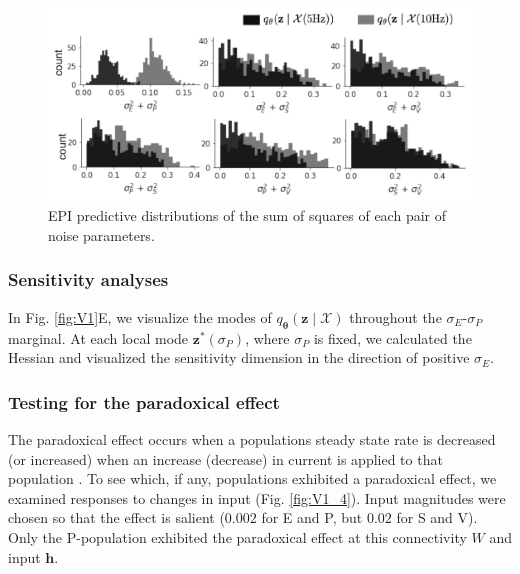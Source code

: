 \documentclass[11pt]{article}
\begin{document}
\begin{figure}
\caption{EPI predictive distributions of the sum of squares of each pair of noise parameters.
 }
 \label{fig:V1_3}
\begin{center}
\includegraphics[scale=.8]{figures/figV1_2/figV1_2.pdf}
\end{center}
\end{figure}


\subsubsection{Sensitivity analyses}
In Fig. \ref{fig:V1}E, we visualize the modes of $q_{\bm{\theta}}(\mathbf{z} \mid \mathcal{X})$ throughout the $\sigma_E$-$\sigma_P$ marginal.
At each local mode $\mathbf{z}^*(\sigma_P)$, where $\sigma_P$ is fixed, we calculated the Hessian and visualized the sensitivity dimension in the direction of positive $\sigma_E$.

\subsubsection{Testing for the paradoxical effect}
The paradoxical effect occurs when a populations steady state rate is decreased (or increased) when an increase (decrease) in current is applied to that population \cite{tsodyks1997paradoxical}.
To see which, if any, populations exhibited a paradoxical effect, we examined responses to changes in input (Fig. \ref{fig:V1_4}).
Input magnitudes were chosen so that the effect is salient ($0.002$ for E and P, but $0.02$ for S and V).
Only the P-population exhibited the paradoxical effect at this connectivity $W$ and input $\mathbf{h}$.
\end{document}

